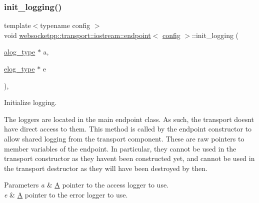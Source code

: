 \subsubsection{\texorpdfstring{init\+\_\+logging()}{init\_logging()}}
{\footnotesize\ttfamily template$<$typename config $>$ \\
void \mbox{\hyperlink{classwebsocketpp_1_1transport_1_1iostream_1_1endpoint}{websocketpp\+::transport\+::iostream\+::endpoint}}$<$ \mbox{\hyperlink{classconfig}{config}} $>$\+::init\+\_\+logging (\begin{DoxyParamCaption}\item[{\mbox{\hyperlink{classwebsocketpp_1_1transport_1_1iostream_1_1endpoint_af176dc3a44caefab71de271c27873c81}{alog\+\_\+type}} $\ast$}]{a,  }\item[{\mbox{\hyperlink{classwebsocketpp_1_1transport_1_1iostream_1_1endpoint_a0aafebd80866c13bef4caa45e48a8ede}{elog\+\_\+type}} $\ast$}]{e }\end{DoxyParamCaption})\hspace{0.3cm}{\ttfamily [inline]}, {\ttfamily [protected]}}



Initialize logging. 

The loggers are located in the main endpoint class. As such, the transport doesn\textquotesingle{}t have direct access to them. This method is called by the endpoint constructor to allow shared logging from the transport component. These are raw pointers to member variables of the endpoint. In particular, they cannot be used in the transport constructor as they haven\textquotesingle{}t been constructed yet, and cannot be used in the transport destructor as they will have been destroyed by then.


\begin{DoxyParams}{Parameters}
{\em a} & \mbox{\hyperlink{struct_a}{A}} pointer to the access logger to use. \\
\hline
{\em e} & \mbox{\hyperlink{struct_a}{A}} pointer to the error logger to use. \\
\hline
\end{DoxyParams}
\mbox{\label{classwebsocketpp_1_1transport_1_1iostream_1_1endpoint_a42cfc1af42cd261b471bab53b85a2e2f}} 
